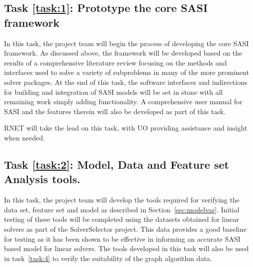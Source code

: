 %

\setcounter{taskCount}{0}

\label{task:1}
\subsection{Task \ref{task:1}: Prototype the core SASI framework}
In this task, the project team will begin the process of developing the core SASI framework. As discussed above, the framework
will be developed based on the results of a comprehensive literature review focusing on the methods 
and interfaces used to solve a variety of subproblems in many of the more prominent solver packages.
At the end of this task, the software interfaces and indirections for building and integration of SASI models 
will be set in stone with all remaining work simply adding functionality. A comprehensive user manual for SASI and
the features therein will also be developed as part of this task. 

RNET will take the lead on this task, with UO providing assistance and insight when needed. 

\label{task:2}
\subsection{Task \ref{task:2}: Model, Data and Feature set Analysis tools. }
In this task, the project team will develop the tools required for verifying the data set, feature set and model as described in Section~\ref{sec:modelvar}. Initial testing of these tools will be completed using the datasets obtained for linear solvers as part of the SolverSelector project. This data provides a good baseline for testing as it has been shown to be effective in informing an accurate SASI based model for linear solvers. The tools developed in this task will also be used in task~\ref{task:4} to verify the suitability of the graph algorithm data. 


